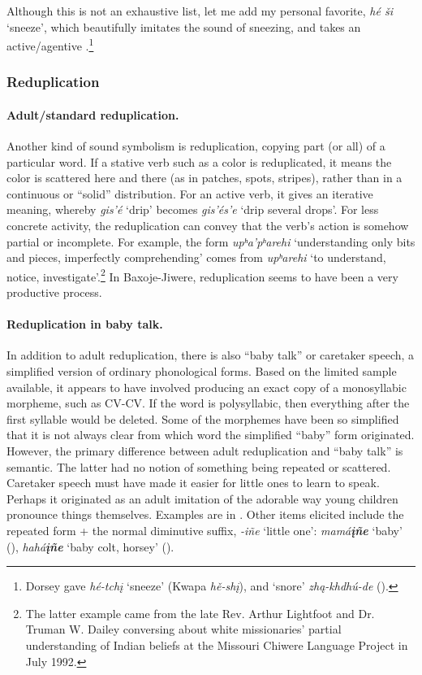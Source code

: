 \documentclass[output=paper]{LSP/langsci}
\begin{document}
Although this is not an exhaustive list, let me add my personal favorite, \textit{hé \v{s}i} `sneeze', which beautifully imitates the sound of sneezing, and takes an active/agentive .\footnote{Dorsey gave  \textit{hé-tch\k{i}} `sneeze' (Kwapa \textit{h\v{e}-sh\k{i}}), and `snore' \textit{zh\k{a}-khdhú-de} (\citeyear[8]{Dorsey1892}).}  

\subsubsection{Reduplication}		
											
\paragraph*{Adult/standard reduplication.}	Another kind of sound symbolism is reduplication, copying part (or all) of a particular word. If a stative verb such as a color is reduplicated, it means the color is scattered here and there (as in patches, spots, stripes), rather than in a continuous or ``solid'' distribution.  For an active verb, it gives an iterative meaning, whereby \textit{gis'é} `drip' becomes \textit{gis'és'e} `drip several drops'.  For less concrete activity, the reduplication can convey that the verb's action is somehow partial or incomplete.  For example, the form \textit{upʰa'pʰarehi} `understanding only bits and pieces, imperfectly comprehending' comes from \textit{upʰarehi} `to understand, notice, investigate'.\footnote{The latter example came from the late Rev. Arthur Lightfoot and Dr. Truman W. Dailey conversing about white missionaries' partial understanding of Indian beliefs at the Missouri Chiwere Language Project in July 1992.} In Baxoje-Jiwere, reduplication seems to have been a very productive process.	

\noindent														
\paragraph*{Reduplication in baby talk.} In addition to adult reduplication, there is also ``baby talk'' or caretaker speech, a simplified version of ordinary phonological forms. Based on the limited sample available, it appears to have involved producing an exact copy of a monosyllabic morpheme, such as CV-CV.  If the word is polysyllabic, then everything after the first syllable would be deleted.  Some of the morphemes have been so simplified that it is not always clear from which word the simplified ``baby'' form originated. However, the primary difference between adult reduplication and ``baby talk'' is semantic.  The latter had no notion of something being repeated or scattered. Caretaker speech must have made it easier for little ones to learn to speak. Perhaps it originated as an adult imitation of the adorable way young children pronounce things themselves. Examples are in . 	Other items elicited include the repeated form + the normal diminutive suffix, \textit{-iñe} `little one':  \textit{mamá\textbf{\k{i}ñe}} `baby' (), \textit{hahá\textbf{\k{i}ñe}} `baby colt, horsey' (\citealt{Davidson1997}).
\end{document}
